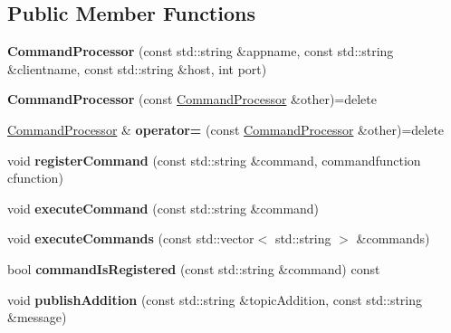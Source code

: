 \subsection*{Public Member Functions}
\begin{DoxyCompactItemize}
\item 
{\bfseries Command\+Processor} (const std\+::string \&appname, const std\+::string \&clientname, const std\+::string \&host, int port)\hypertarget{class_command_processor_a053c5d39a7c42ddaeeab11467a052e98}{}\label{class_command_processor_a053c5d39a7c42ddaeeab11467a052e98}

\item 
{\bfseries Command\+Processor} (const \hyperlink{class_command_processor}{Command\+Processor} \&other)=delete\hypertarget{class_command_processor_ad3ed59d0f22d979f2010a541a08c1ee3}{}\label{class_command_processor_ad3ed59d0f22d979f2010a541a08c1ee3}

\item 
\hyperlink{class_command_processor}{Command\+Processor} \& {\bfseries operator=} (const \hyperlink{class_command_processor}{Command\+Processor} \&other)=delete\hypertarget{class_command_processor_a1068633e1f6af69a67de06f10d8dba3a}{}\label{class_command_processor_a1068633e1f6af69a67de06f10d8dba3a}

\item 
void {\bfseries register\+Command} (const std\+::string \&command, commandfunction cfunction)\hypertarget{class_command_processor_a72e15bc0082d628bd05aacedd5aa7ee0}{}\label{class_command_processor_a72e15bc0082d628bd05aacedd5aa7ee0}

\item 
void {\bfseries execute\+Command} (const std\+::string \&command)\hypertarget{class_command_processor_a3a830f1939e458f31f0cd2d42855609f}{}\label{class_command_processor_a3a830f1939e458f31f0cd2d42855609f}

\item 
void {\bfseries execute\+Commands} (const std\+::vector$<$ std\+::string $>$ \&commands)\hypertarget{class_command_processor_a9c23c88fe12e643092993a8bb2aa0528}{}\label{class_command_processor_a9c23c88fe12e643092993a8bb2aa0528}

\item 
bool {\bfseries command\+Is\+Registered} (const std\+::string \&command) const \hypertarget{class_command_processor_a11c9458174f6909a46b20d26bc489f68}{}\label{class_command_processor_a11c9458174f6909a46b20d26bc489f68}

\item 
void {\bfseries publish\+Addition} (const std\+::string \&topic\+Addition, const std\+::string \&message)\hypertarget{class_command_processor_a88ad204c02a79887698c6abc93729a2d}{}\label{class_command_processor_a88ad204c02a79887698c6abc93729a2d}


\end{DoxyCompactItemize}
